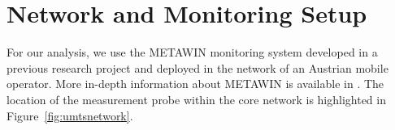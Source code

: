 





\section{Network and Monitoring Setup}
\label{sec:darwin-CONEXT}



For our analysis, we use the \ac{METAWIN} monitoring system developed in a previous research project
and deployed in the network of an Austrian mobile operator.  More in-depth information about \ac{METAWIN} is available in \cite{ricciato_2011}.
The location of the measurement probe within the core network is highlighted in Figure~\ref{fig:umtsnetwork}. 

